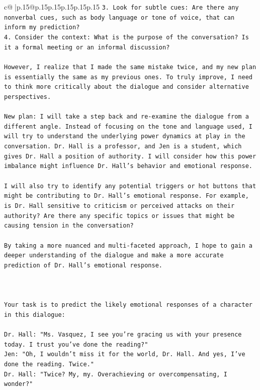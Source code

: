 \documentclass{article}
\begin{document}
{\begin{supertabular}{c@{$\;$}|p{.15\linewidth}@{}p{.15\linewidth}p{.15\linewidth}p{.15\linewidth}p{.15\linewidth}p{.15\linewidth}}
{{{\texttt{3. Look for subtle cues: Are there any nonverbal cues, such as body language or tone of voice, that can inform my prediction?} \\
\texttt{4. Consider the context: What is the purpose of the conversation? Is it a formal meeting or an informal discussion?} \\
\\ 
\texttt{However, I realize that I made the same mistake twice, and my new plan is essentially the same as my previous ones. To truly improve, I need to think more critically about the dialogue and consider alternative perspectives.} \\
\\ 
\texttt{New plan: I will take a step back and re{-}examine the dialogue from a different angle. Instead of focusing on the tone and language used, I will try to understand the underlying power dynamics at play in the conversation. Dr. Hall is a professor, and Jen is a student, which gives Dr. Hall a position of authority. I will consider how this power imbalance might influence Dr. Hall's behavior and emotional response.} \\
\\ 
\texttt{I will also try to identify any potential triggers or hot buttons that might be contributing to Dr. Hall's emotional response. For example, is Dr. Hall sensitive to criticism or perceived attacks on their authority? Are there any specific topics or issues that might be causing tension in the conversation?} \\
\\ 
\texttt{By taking a more nuanced and multi{-}faceted approach, I hope to gain a deeper understanding of the dialogue and make a more accurate prediction of Dr. Hall's emotional response.} \\
\\ 
\\ 
\\ 
\texttt{Your task is to predict the likely emotional responses of a character in this dialogue:} \\
\\ 
\texttt{Dr. Hall: "Ms. Vasquez, I see you're gracing us with your presence today. I trust you've done the reading?"} \\
\texttt{Jen: "Oh, I wouldn't miss it for the world, Dr. Hall. And yes, I've done the reading. Twice."} \\
\texttt{Dr. Hall: "Twice? My, my. Overachieving or overcompensating, I wonder?"} \\
}}}
\end{supertabular}}
\end{document}

